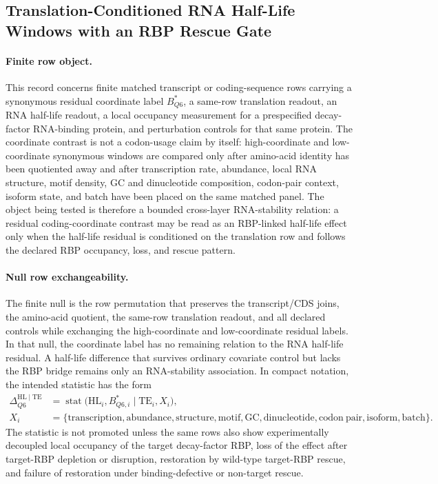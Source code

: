 \subsection{Translation-Conditioned RNA Half-Life Windows with an RBP Rescue Gate}
\label{sec:q6-translation-conditioned-rna-half-life-rbp-bridge}

\paragraph{Finite row object.}
This record concerns finite matched transcript or coding-sequence rows carrying a synonymous residual coordinate label $B^{\ast}_{Q6}$, a same-row translation readout, an RNA half-life readout, a local occupancy measurement for a prespecified decay-factor RNA-binding protein, and perturbation controls for that same protein.  The coordinate contrast is not a codon-usage claim by itself: high-coordinate and low-coordinate synonymous windows are compared only after amino-acid identity has been quotiented away and after transcription rate, abundance, local RNA structure, motif density, GC and dinucleotide composition, codon-pair context, isoform state, and batch have been placed on the same matched panel.  The object being tested is therefore a bounded cross-layer RNA-stability relation: a residual coding-coordinate contrast may be read as an RBP-linked half-life effect only when the half-life residual is conditioned on the translation row and follows the declared RBP occupancy, loss, and rescue pattern.

\paragraph{Null row exchangeability.}
The finite null is the row permutation that preserves the transcript/CDS joins, the amino-acid quotient, the same-row translation readout, and all declared controls while exchanging the high-coordinate and low-coordinate residual labels.  In that null, the coordinate label has no remaining relation to the RNA half-life residual.  A half-life difference that survives ordinary covariate control but lacks the RBP bridge remains only an RNA-stability association.  In compact notation, the intended statistic has the form
$$
\begin{aligned}
\Delta_{Q6}^{\mathrm{HL}\mid\mathrm{TE}}
  &= \operatorname{stat}\bigl(\mathrm{HL}_{i}, B^{\ast}_{Q6,i} \mid \mathrm{TE}_{i}, X_{i}\bigr),\\
X_i
  &= \{\mathrm{transcription},\mathrm{abundance},\mathrm{structure},\mathrm{motif},\mathrm{GC},
       \mathrm{dinucleotide},\mathrm{codon\ pair},\mathrm{isoform},\mathrm{batch}\}.
\end{aligned}
$$
The statistic is not promoted unless the same rows also show experimentally decoupled local occupancy of the target decay-factor RBP, loss of the effect after target-RBP depletion or disruption, restoration by wild-type target-RBP rescue, and failure of restoration under binding-defective or non-target rescue.


